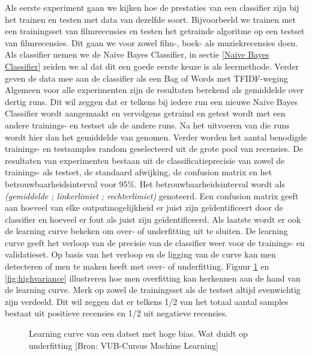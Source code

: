Als eerste experiment gaan we kijken hoe de prestaties van een classifier zijn bij het trainen en testen met data van dezelfde soort. Bijvoorbeeld we trainen met een trainingsset van filmrecensies en testen het getrainde algoritme op een testset van filmrecensies. Dit gaan we voor zowel film-, boek- als muziekrecensies doen. Als classifier nemen we de Naive Bayes Classifier, in sectie \ref{Naive Bayes Classifier} zeiden we al dat dit een goede eerste keuze is als leermethode. Verder geven de data mee aan de classifier als een Bag of Words met TFIDF-weging\\
%
Algemeen voor alle experimenten zijn de resultaten berekend als gemiddelde over dertig runs. Dit wil zeggen dat er telkens bij iedere run een nieuwe Naive Bayes Classifier wordt aangemaakt en vervolgens getraind en getest wordt met een andere trainings- en testset als de andere runs. Na het uitvoeren van die runs wordt hier dan het gemiddelde van genomen. Verder worden het aantal benodigde trainings- en testsamples random geselecteerd uit de grote pool van recensies. De resultaten van experimenten bestaan uit de classificatieprecisie van zowel de trainings- als testset, de standaard afwijking, de confusion matrix en het betrouwbaarheidsinterval voor 95\%. Het betrouwbaarheidsinterval wordt als \textit{(gemiddelde ; linkerlimiet ; rechterlimiet)} genoteerd. Een confusion matrix geeft aan hoeveel van elke outputmogelijkheid er juist zijn ge\"identificeert door de classifier en hoeveel er fout als juist zijn ge\"identificeerd. Als laatste wordt er ook de learning curve bekeken om over- of underfitting uit te sluiten. De learning curve geeft het verloop van de precisie van de classifier weer voor de trainings- en validatieset. Op basis van het verloop en de ligging van de curve kan men detecteren of men te maken heeft met over- of underfitting. Figuur \ref{fig:highbias} en \ref{fig:highvariance} illustreren hoe men overfitting kan herkennen aan de hand van de learning curve. Merk op zowel de trainingsset als de testset altijd evenwichtig zijn verdeeld. Dit wil zeggen dat er telkens 1/2 van het totaal aantal samples bestaat uit positieve recensies en 1/2 uit negatieve recensies.
\newpage
\begin{figure}[h]
    \centering
    \caption{Learning curve van een datset met hoge bias. Wat duidt op underfitting [Bron: VUB-Cursus Machine Learning]}
    \label{fig:highbias}
 \end{figure}
